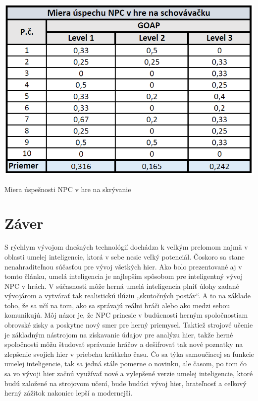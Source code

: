 \documentclass[10pt,twoside,slovak,a4paper]{article}
\begin{document}
\begin{table}[tbh]
\center \includegraphics[scale=0.5]{priklad.png}
\caption{Miera úspešnosti NPC v hre na skrývanie}
\label{t:t2}
\end{table}


\section{Záver} \label{zaver} 
\quad S rýchlym vývojom dnešných technológií dochádza k veľkým prelomom najmä v oblasti umelej inteligencie, ktorá v sebe nesie veľký potenciál. Čoskoro sa stane nenahraditeľnou súčasťou pre vývoj všetkých hier. Ako bolo prezentované aj v tomto článku, umelá inteligencia je najlepším spôsobom pre inteligentný vývoj NPC v hrách. V súčasnosti môže herná umelá inteligencia plniť úlohy zadané vývojárom a vytvárať tak realistickú ilúziu „skutočných postáv“. A to na základe toho, že sa učí na tom, ako sa správajú reálni hráči alebo ako medzi sebou komunikujú. Môj názor je, že NPC prinesie v budúcnosti herným spoločnostiam obrovské zisky a poskytne nový smer pre herný priemysel. Taktiež strojové učenie je základným nástrojom na získavanie údajov pre analýzu hier, takže herné spoločnosti môžu študovať správanie hráčov a dešifrovať tak nové poznatky na zlepšenie svojich hier v priebehu krátkeho času. Čo sa týka samoučiacej sa funkcie umelej inteligencie, tak sa jedná stále pomerne o novinku, ale časom, po tom čo sa vo vývoji hier začnú využívať nové a vylepšené verzie umelej inteligencie, ktoré budú založené na strojovom učení, bude budúci vývoj hier, hrateľnosť a celkový herný zážitok nakoniec lepší a modernejší.







\end{document}
